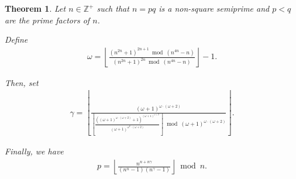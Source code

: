 \documentclass[11pt,reqno]{article}
\theoremstyle{plain}
\newtheorem{theorem}{Theorem}
\theoremstyle{definition}
\newcommand{\floor}[1]{\left\lfloor #1 \right\rfloor}
\begin{document}
\begin{theorem} \label{proof:semiprimefactorp1}
Let $n \in \mathbb{Z}^+$ such that $n = p q$ is a non-square semiprime and $p < q$ are the prime factors of $n$.

Define
\begin{align*}
\omega = \floor{\frac{(n^{2n} + 1)^{2n+1} \bmod (n^{4n}-n)}{(n^{2n} + 1)^{2n} \bmod (n^{4n}-n)}} - 1 .
\end{align*}

Then, set
\begin{align*}
\gamma = \floor
{
    \frac
    {
        (\omega+1)^{\omega\cdot(\omega+2)}
    }
    {
        \floor
        {
            \frac
            {
            \left( (\omega+1)^{\omega\cdot(\omega+2)} + 1 \right)^{(\omega+1)^{\omega+2}}
            }
            {
            (\omega+1)^{\omega^2\cdot(\omega+2)}
            }
        }
        \bmod (\omega+1)^{\omega\cdot(\omega+2)}
    }
} .
\end{align*}

Finally, we have
\begin{align*}
p = \floor{\frac{n^{n+n\gamma}}{(n^n-1)(n^{\gamma}-1)}}\bmod n .
\end{align*}
\end{theorem}
\end{document}
